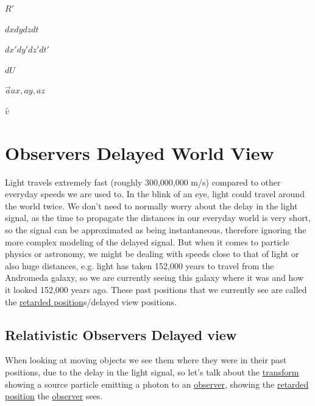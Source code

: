 $R'$ \newline

$dx dy dz dt$ \newline

$dx' dy' dz' dt'$ \newline

$dU$ \newline

$\vec{a} ax, ay, az$ \newline

$\hat{v}$ \newline

\chapter{Observers Delayed World View}

Light travels extremely fast (roughly 300,000,000 m/s) compared to other everyday speeds we are used to. In the blink of an eye, light could travel around the world twice. We don't need to normally worry about the delay in the light signal, as the time to propagate the distances in our everyday world is very short, so the signal can be approximated as being instantaneous, therefore ignoring the more complex modeling of the delayed signal. But when it comes to particle physics or astronomy, we might be dealing with speeds close to that of light or also huge distances, e.g. light has taken 152,000 years to travel from the Andromeda galaxy, so we are currently seeing this galaxy where it was and how it looked 152,000 years ago. These past positions that we currently see are called the \hyperlink{def-retarded-position}{retarded position}s/delayed view positions.

\section{Relativistic Observers Delayed view}

When looking at moving objects we see them where they were in their past positions, due to the delay in the light signal, so let's talk about the \hyperlink{def-transform}{transform} showing a source particle emitting a photon to an \hyperlink{def-observer}{observer}, showing the \hyperlink{def-retarded-position}{retarded position} the \hyperlink{def-observer}{observer} sees.


